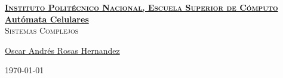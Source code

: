 \documentclass[12pt, fleqn]{report}                             %
\author{Oscar Andrés Rosas}                                     %
\theoremstyle{break}                                            %
\begin{document}
\begin{titlepage}
    
    \pagecolor{TitlePageColor}                                      %
    \color{white}                                                   %

    \vspace                                                         %
    \baselineskip                                                   %

    \makebox[0pt][l]{\rule{1.3\textwidth}{3pt}}                     %
    
    \href{https://compilandoconocimiento.com}                       %
    {\textbf{\textsc{\Huge Instituto Politécnico Nacional, Escuela Superior de Cómputo}}}\\[2.7cm]      %

    \href{\ProjectNameLink}                                         %
    {\fontsize{45}{52}\selectfont \textbf{Autómata Celulares}}\\[0.5cm] %
    \textcolor{ColorSubtext}{\textsc{\Huge Sistemas Complejos}}     %
    
    \vfill                                                          %
    
    \href{\ProjectAuthorLink}                                       %
    {\LARGE \textsf{Oscar Andrés Rosas Hernandez}}                  %

    \vspace                                                         %
    \baselineskip                                                   %
    
    {\large \textsf{\today}}                                        %

\end{titlepage}
\end{document}
